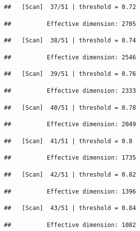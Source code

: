 \documentclass[
]{book}
\begin{document}
\begin{verbatim}
##   [Scan]  37/51 | threshold = 0.72
\end{verbatim}

\begin{verbatim}
##          Effective dimension: 2705
\end{verbatim}

\begin{verbatim}
##   [Scan]  38/51 | threshold = 0.74
\end{verbatim}

\begin{verbatim}
##          Effective dimension: 2546
\end{verbatim}

\begin{verbatim}
##   [Scan]  39/51 | threshold = 0.76
\end{verbatim}

\begin{verbatim}
##          Effective dimension: 2333
\end{verbatim}

\begin{verbatim}
##   [Scan]  40/51 | threshold = 0.78
\end{verbatim}

\begin{verbatim}
##          Effective dimension: 2049
\end{verbatim}

\begin{verbatim}
##   [Scan]  41/51 | threshold = 0.8
\end{verbatim}

\begin{verbatim}
##          Effective dimension: 1735
\end{verbatim}

\begin{verbatim}
##   [Scan]  42/51 | threshold = 0.82
\end{verbatim}

\begin{verbatim}
##          Effective dimension: 1396
\end{verbatim}

\begin{verbatim}
##   [Scan]  43/51 | threshold = 0.84
\end{verbatim}

\begin{verbatim}
##          Effective dimension: 1082
\end{verbatim}
\end{document}
